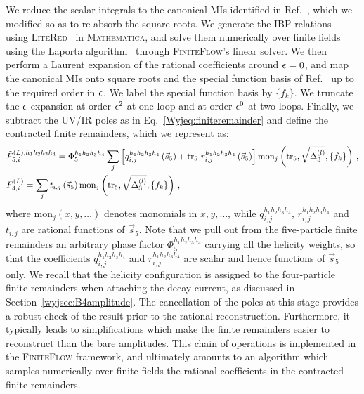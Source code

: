 \documentclass[main.tex]{subfiles}
\begin{document}
We reduce the scalar integrals to the canonical MIs identified in Ref.~\cite{Abreu:2020jxa}, which we modified so as to re-absorb the square roots. We generate the IBP relations~\cite{Chetyrkin:1981qh} using \textsc{LiteRed}~\cite{Lee:2012cn} in \textsc{Mathematica}, and solve them numerically over finite fields using the Laporta algorithm~\cite{Laporta:2000dsw} through \textsc{FiniteFlow}'s linear solver. We then perform a Laurent expansion of the rational coefficients around $\epsilon=0$, and map the canonical MIs onto square roots and the special function basis of  Ref.~\cite{Badger:2021nhg} up to the required order in $\epsilon$. We label the special function basis by $\{f_k\}$. We truncate the $\epsilon$ expansion at order $\epsilon^2$ at one loop and at order $\epsilon^0$ at two loops. Finally, we subtract the UV/IR poles as in Eq.~\eqref{Wyjeq:finiteremainder} and define the contracted finite remainders, which we represent as:
\begin{align} \label{Wyjeq:finrem_ratcoeffs}
\begin{aligned}
& \tilde{F}_{5,i}^{(L), h_1h_2h_3h_4} = \Phi^{h_1h_2h_3h_4}_{5} \sum_j \left[ q_{i,j}^{h_1h_2h_3h_4}\left(\vec{s}_5\right) + \operatorname{\rm tr}_5 \, r_{i,j}^{h_1h_2h_3h_4} \left(\vec{s}_5\right) \right] \text{mon}_j\left(\operatorname{\rm tr}_5,\sqrt{\Delta_3^{(l)}}, \{f_k\} \right) \,, \\
& \tilde{F}_{4,i}^{(L)} = \sum_j t_{i,j}\left(\vec{s}_5\right) \text{mon}_j\left(\operatorname{\rm tr}_5,\sqrt{\Delta_3^{(l)}}, \{f_k\} \right) \,, \\
\end{aligned}
\end{align}
where $\text{mon}_j(x,y,\ldots)$ denotes monomials in $x,y,\ldots$, while $q_{i,j}^{h_1h_2h_3h_4}$, $r_{i,j}^{h_1h_2h_3h_4}$ and $t_{i,j}$ are rational functions of $\vec{s}_5$. Note that we pull out from the five-particle finite remainders an arbitrary phase factor $\Phi^{h_1h_2h_3h_4}_{5}$ carrying all the helicity weights, so that the coefficients $q_{i,j}^{h_1h_2h_3h_4}$ and $r_{i,j}^{h_1h_2h_3h_4}$ are scalar and hence functions of $\vec{s}_5$ only. We recall that the helicity configuration is assigned to the four-particle finite remainders when attaching the decay current, as discussed in Section~\ref{wyjsec:B4amplitude}. The cancellation of the poles at this stage provides a robust check of the result prior to the rational reconstruction. Furthermore, it typically leads to simplifications which make the finite remainders easier to reconstruct than the bare amplitudes. This chain of operations is implemented in the \textsc{FiniteFlow} framework, and ultimately amounts to an algorithm which samples numerically over finite fields the rational coefficients in the contracted finite remainders.
\end{document}
